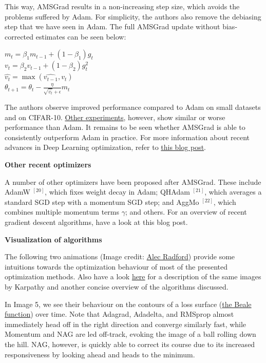 \documentclass[4pt,journal,compsoc]{IEEEtran}
\begin{document}
\begin{flushleft}
    This way, AMSGrad results in a non-increasing step size, which avoids the problems suffered by Adam. For simplicity, the authors also remove the debiasing step that we have seen in Adam. The full AMSGrad update without bias-corrected estimates can be seen below: \newline
    
    $m_t = \beta_1 m_{t-1} + (1 - \beta_1) g_t$\\
    $v_t = \beta_2 v_{t-1} + (1 - \beta_2) g_t ^ 2$ \\
    $\hat{v_t} = \max (\hat{v_{t-1}}, v_t)$ \\
    $\theta_{t+1} = \theta_t - \frac{\eta}{\sqrt{\hat{v_t}} + \epsilon} m_t$ \newline
    
    The authors observe improved performance compared to Adam on small datasets and on CIFAR-10. \underline{Other experiments}, however, show similar or worse performance than Adam. It remains to be seen whether AMSGrad is able to consistently outperform Adam in practice. For more information about recent advances in Deep Learning optimization, refer to \underline{this blog post}. \newline \newline
    
    \textbf{\Large Other recent optimizers} \newline
    
    A number of other optimizers have been proposed after AMSGrad. These include AdamW $^ {[20]}$, which fixes weight decay in Adam; QHAdam $^ {[21]}$, which averages a standard SGD step with a momentum SGD step; and AggMo $^ {[22]}$, which combines multiple momentum terms $\gamma$; and others. For an overview of recent gradient descent algorithms, have a look at this blog post. \newline \newline
    
    \textbf{\Large Visualization of algorithms} \newline
    
    The following two animations (Image credit: \underline{Alec Radford}) provide some intuitions towards the optimization behaviour of most of the presented optimization methods. Also have a look \underline{here} for a description of the same images by Karpathy and another concise overview of the algorithms discussed. \newline

    In Image 5, we see their behaviour on the contours of a loss surface (\underline{the Beale function}) over time. Note that Adagrad, Adadelta, and RMSprop almost immediately head off in the right direction and converge similarly fast, while Momentum and NAG are led off-track, evoking the image of a ball rolling down the hill. NAG, however, is quickly able to correct its course due to its increased responsiveness by looking ahead and heads to the minimum. \newline


\end{flushleft}
\end{document}
